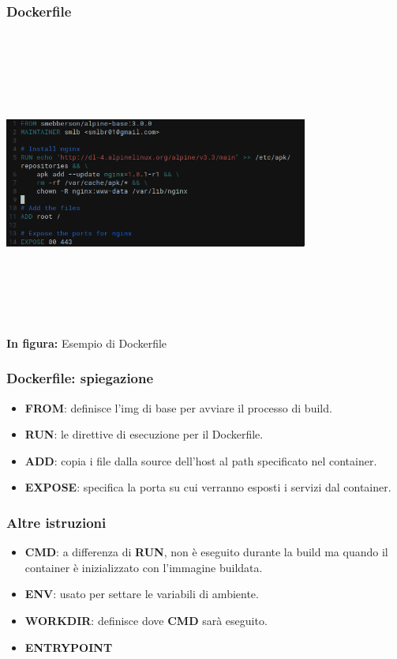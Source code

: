 \documentclass{beamer}
\begin{document}
\begin{frame}
    \frametitle{Dockerfile}
    \begin{center}
        \includegraphics[width=10cm,height=10cm,keepaspectratio]{dockerfile.png}
        \\ \textbf{In figura:} Esempio di Dockerfile
    \end{center}
\end{frame}


\begin{frame}
    \frametitle{Dockerfile: spiegazione}
    \begin{itemize}
        \item<1->\textbf{FROM}: definisce l'img di base per avviare il processo di build.
        \item<2->\textbf{RUN}: le direttive di esecuzione per il Dockerfile.
        \item<3->\textbf{ADD}: copia i file dalla source dell'host al path specificato nel container.
        \item<4->\textbf{EXPOSE}: specifica la porta su cui verranno esposti i servizi dal container.
    \end{itemize}
\end{frame}

\begin{frame}    
    \frametitle{Altre istruzioni}
    \begin{itemize}
        \item<1-> \textbf{CMD}: a differenza di \textbf{RUN}, non \`e eseguito durante la build ma quando il container \`e inizializzato con l'immagine buildata.
        \item<2-> \textbf{ENV}: usato per settare le variabili di ambiente. 
        \item<3-> \textbf{WORKDIR}: definisce dove \textbf{CMD} sar\`a eseguito. 
        \item<4-> \textbf{ENTRYPOINT} 
    \end{itemize}
\end{frame}
\end{document}
